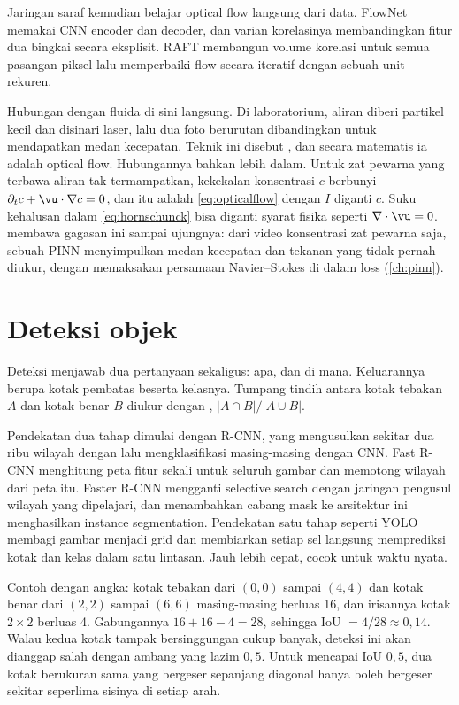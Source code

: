 Jaringan saraf kemudian belajar optical flow langsung dari data. FlowNet \citep{dosovitskiy2015}
memakai CNN encoder dan decoder, dan varian korelasinya membandingkan fitur dua bingkai secara
eksplisit. RAFT \citep{teed2020} membangun volume korelasi untuk semua pasangan piksel lalu
memperbaiki flow secara iteratif dengan sebuah unit rekuren.

Hubungan dengan fluida di sini langsung. Di laboratorium, aliran diberi partikel kecil dan
disinari laser, lalu dua foto berurutan dibandingkan untuk mendapatkan medan kecepatan. Teknik ini
disebut , dan secara matematis ia adalah optical flow. Hubungannya
bahkan lebih dalam. Untuk zat pewarna yang terbawa aliran tak termampatkan, kekekalan konsentrasi
$c$ berbunyi $\partial_tc+\vu\cdot\nabla c=0$, dan itu adalah \cref{eq:opticalflow} dengan $I$
diganti $c$. Suku kehalusan dalam \cref{eq:hornschunck} bisa diganti syarat fisika seperti
$\nabla\cdot\vu=0$. \citet{raissi2020} membawa gagasan ini sampai ujungnya: dari video konsentrasi
zat pewarna saja, sebuah PINN menyimpulkan medan kecepatan dan tekanan yang tidak pernah diukur,
dengan memaksakan persamaan Navier--Stokes di dalam loss (\cref{ch:pinn}).

\section{Deteksi objek}

Deteksi menjawab dua pertanyaan sekaligus: apa, dan di mana. Keluarannya berupa kotak pembatas
beserta kelasnya. Tumpang tindih antara kotak tebakan $A$ dan kotak benar $B$ diukur dengan
, $|A\cap B|/|A\cup B|$.

Pendekatan dua tahap dimulai dengan R-CNN, yang mengusulkan sekitar dua ribu wilayah dengan
 lalu mengklasifikasi masing-masing dengan CNN. Fast R-CNN
\citep{girshick2015} menghitung peta fitur sekali untuk seluruh gambar dan memotong wilayah dari
peta itu. Faster R-CNN \citep{ren2015} mengganti selective search dengan jaringan pengusul wilayah
yang dipelajari, dan menambahkan cabang mask ke arsitektur ini menghasilkan instance
segmentation. Pendekatan satu tahap seperti YOLO \citep{redmon2016} membagi gambar menjadi grid dan
membiarkan setiap sel langsung memprediksi kotak dan kelas dalam satu lintasan. Jauh lebih cepat,
cocok untuk waktu nyata.

Contoh dengan angka: kotak tebakan dari $(0,0)$ sampai $(4,4)$ dan kotak benar dari $(2,2)$ sampai $(6,6)$ masing-masing
berluas 16, dan irisannya kotak $2\times2$ berluas 4. Gabungannya $16+16-4=28$, sehingga IoU $=4/28\approx0{,}14$. Walau
kedua kotak tampak bersinggungan cukup banyak, deteksi ini akan dianggap salah dengan ambang yang lazim $0{,}5$. Untuk
mencapai IoU $0{,}5$, dua kotak berukuran sama yang bergeser sepanjang diagonal hanya boleh bergeser sekitar seperlima
sisinya di setiap arah.

